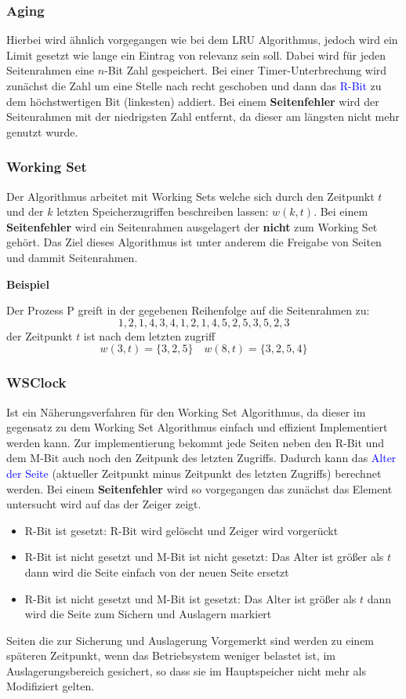 \documentclass[10pt,a4paper]{article}
\begin{document}
\begin{multicols*}{4}
\subsubsection*{Aging}
Hierbei wird ähnlich vorgegangen wie bei dem LRU Algorithmus, jedoch wird ein Limit gesetzt wie lange ein Eintrag von
relevanz sein soll. Dabei wird für jeden Seitenrahmen eine \(n\)-Bit Zahl gespeichert. Bei einer Timer-Unterbrechung
wird zunächst die Zahl um eine Stelle nach recht geschoben und dann das \textcolor{blue}{R-Bit} zu dem höchstwertigen
Bit (linkesten) addiert. Bei einem \textbf{Seitenfehler} wird der Seitenrahmen mit der niedrigsten Zahl entfernt, da
dieser am längsten nicht mehr genutzt wurde.

\subsubsection*{Working Set}
Der Algorithmus arbeitet mit Working Sets welche sich durch den Zeitpunkt \(t\) und der \(k\) letzten Speicherzugriffen
beschreiben lassen: \(w(k,t)\). Bei einem \textbf{Seitenfehler} wird ein Seitenrahmen ausgelagert der \textbf{nicht}
zum Working Set gehört. Das Ziel dieses Algorithmus ist unter anderem die Freigabe von Seiten und dammit Seitenrahmen.

\vspace{1ex}\textbf{\footnotesize Beispiel}\hfill\par
Der Prozess P greift in der gegebenen Reihenfolge auf die Seitenrahmen zu:
\[1,2,1,4,3,4,1,2,1,4,5,2,5,3,5,2,3\]
der Zeitpunkt \(t\) ist nach dem letzten zugriff
\[w(3,t) = \{3,2,5\} \quad w(8,t) = \{3,2,5,4\}\]

\subsubsection*{WSClock}
Ist ein Näherungsverfahren für den Working Set Algorithmus, da dieser im gegensatz zu dem Working Set Algorithmus
einfach und effizient Implementiert werden kann. Zur implementierung bekommt jede Seiten neben den R-Bit und dem M-Bit
auch noch den Zeitpunk des letzten Zugriffs. Dadurch kann das \textcolor{blue}{Alter der Seite}
(aktueller Zeitpunkt minus Zeitpunkt des letzten Zugriffs) berechnet werden. Bei einem \textbf{Seitenfehler} wird so
vorgegangen das zunächst das Element untersucht wird auf das der Zeiger zeigt.
\begin{itemize}
	\item R-Bit ist gesetzt: R-Bit wird gelöscht und Zeiger wird vorgerückt
	\item R-Bit ist nicht gesetzt und M-Bit ist nicht gesetzt: Das Alter ist größer als \(t\) dann wird die Seite
	      einfach von der neuen Seite ersetzt
	\item R-Bit ist nicht gesetzt und M-Bit ist gesetzt: Das Alter ist größer als \(t\) dann wird die Seite zum Sichern
	      und Auslagern markiert
\end{itemize}
Seiten die zur Sicherung und Auslagerung Vorgemerkt sind werden zu einem späteren Zeitpunkt, wenn das Betriebsystem
weniger belastet ist, im Auslagerungsbereich gesichert, so dass sie im Hauptspeicher nicht mehr als Modifiziert gelten.


\end{multicols*}
\end{document}
